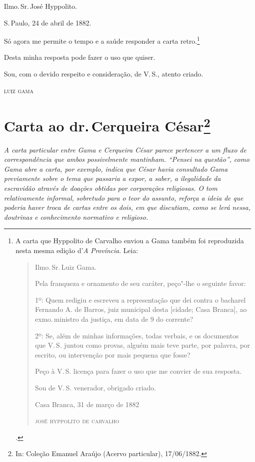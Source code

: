 Ilmo.\,Sr.\,José Hyppolito.

S.\,Paulo, 24 de abril de 1882.

Só agora me permite o tempo e a saúde responder a carta retro.\footnote{
  A carta que Hyppolito de Carvalho enviou a Gama também foi reproduzida
  nesta mesma edição d'\emph{A} \emph{Província}. Leia:

  \begin{quote}\footnotesize
  Ilmo.\,Sr.\,Luiz Gama.

  Pela franqueza e ornamento de seu caráter, peço"-lhe o seguinte favor:

  1º: Quem redigiu e escreveu a representação que dei contra o bacharel
  Fernando A. de Barros, juiz municipal desta {[}cidade; Casa Branca{]},
  ao exmo.\,ministro da justiça, em data de 9 do corrente?

  2º: Se, além de minhas informações, todas verbais, e os documentos que
  V.\,S. juntou como provas, alguém mais teve parte, por palavra, por
  escrito, ou intervenção por mais pequena que fosse?

  Peço à V.\,S. licença para fazer o uso que me convier de sua resposta.

  \noindent{}Sou de V.\,S. venerador, obrigado criado.

  \noindent{}Casa Branca, 31 de março de 1882

  \noindent\textsc{josé hyppolito de carvalho}\end{quote}.}


Desta minha resposta pode fazer o uso que quiser.

Sou, com o devido respeito e consideração, de V.\,S., atento criado.

\hfill\textsc{luiz gama}


\chapter{Carta ao dr.\,Cerqueira César\footnote[*]{In: Coleção Emanuel
  Araújo (Acervo particular), 17/06/1882.}}

\begin{flushleft}
{\footnotesize\itshape
A carta particular entre Gama e Cerqueira César parece pertencer a
um fluxo de correspondência que ambos possivelmente mantinham. ``Pensei
na questão'', como Gama abre a carta, por exemplo, indica que César havia
consultado Gama previamente sobre o tema que passaria a expor, a saber,
a ilegalidade da escravidão através de doações obtidas por corporações
religiosas. O tom relativamente informal, sobretudo para o teor do
assunto, reforça a ideia de que poderia haver troca de cartas entre os
dois, em que discutiam, como se lerá nessa, doutrinas e conhecimento
normativo e religioso. }
\end{flushleft}

